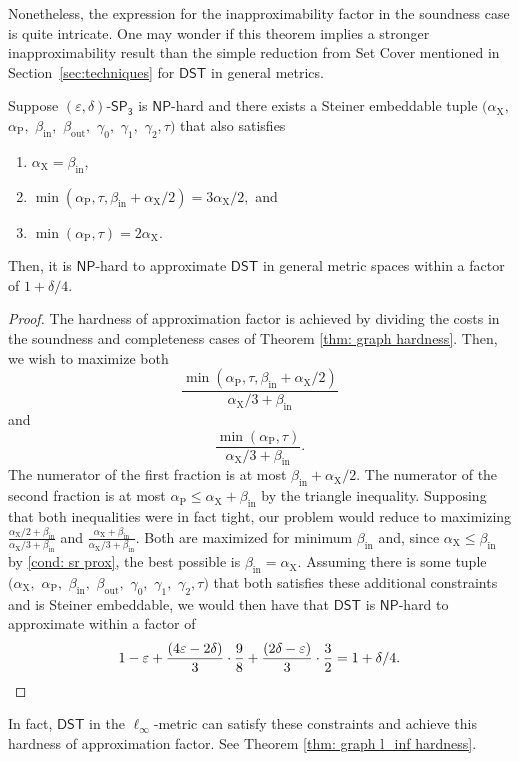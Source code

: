 \documentclass{theoretics}
\newcommand{\1}{\textbf{1}}
\newcommand{\setpT}{$\mathsf{SP_3}$\xspace}
\newcommand{\dst}{$\mathsf{DST}$\xspace}
\newcommand{\np}{$\mathsf{NP}$\xspace}
\newcommand{\td}{\tau}
\newcommand{\srd}{\alpha_{\text{X}}}
\newcommand{\trd}{\alpha_{\text{P}}}
\begin{document}
Nonetheless, the expression for the inapproximability factor in the soundness case is quite intricate. One may wonder if this theorem implies a stronger inapproximability result than the simple reduction from Set Cover mentioned in Section~\ref{sec:techniques} for \dst in general metrics.  
\begin{corollary} \label{cor: general metric useless?}
Suppose $(\varepsilon, \delta)$-\setpT is \np-hard and there exists a Steiner embeddable tuple $(\srd,$ $\trd,$ $\beta_{\text{in}},$ $\beta_{\text{out}},$ $\gamma_0,$ $\gamma_1,$ $\gamma_2,\td)$ that also satisfies 
\begin{enumerate}
    \item $\srd = \beta_{\text{in}}$,
    \item $\min(\trd, \td, \beta_{\text{in}} + \srd/2) = 3\srd/2,$ and
    \item $\min(\trd, \td) =2\srd$.
\end{enumerate}
Then, it is \np-hard to approximate \dst in general metric spaces within a factor of $1 + \delta/4$.
\end{corollary}
\begin{proof}
The hardness of approximation factor is achieved by dividing the costs in the soundness and completeness cases of Theorem \ref{thm: graph hardness}. Then, we wish to maximize both
\[
\frac{\min(\trd, \td, \beta_{\text{in}} + \srd/2)}{\srd/3+\beta_{\text{in}}} 
\]
and 
\[
\frac{\min(\trd, \td)}{\srd/3+\beta_{\text{in}}}.
\]
The numerator of the first fraction is at most $\beta_{\text{in}} + \srd/2$. The numerator of the second fraction is at most $\trd \leq \srd + \beta_{\text{in}}$ by the triangle inequality. Supposing that both inequalities were in fact tight, our problem would reduce to maximizing  $\frac{\srd/2 + \beta_{\text{in}} }{\srd/3+\beta_{\text{in}}}$ and $\frac{\srd + \beta_{\text{in}}}{\srd/3+\beta_{\text{in}}}$. Both are maximized for minimum $\beta_{\text{in}}$ and, since $\srd \leq \beta_{\text{in}}$ by \ref{cond: sr prox}, the best possible is $\beta_{\text{in}} = \srd$. Assuming there is some tuple $(\srd,$ $\trd,$ $\beta_{\text{in}},$ $\beta_{\text{out}},$ $\gamma_0,$ $\gamma_1,$ $\gamma_2,\td)$ that both satisfies these additional constraints and is Steiner embeddable, we would then have that \dst is \np-hard to approximate within a factor of 
\[
1 - \varepsilon + \frac{(4\varepsilon  - 2\delta)}{3}\cdot\frac{9}{8} + \frac{(2\delta  - \varepsilon)}{3} \cdot \frac{3}{2} = 1 + \delta/4.\qedhere
\]
\end{proof}
In fact, \dst in the $\ell_{\infty}$-metric can satisfy these constraints and achieve this hardness of approximation factor. See Theorem \ref{thm: graph l_inf hardness}.
\end{document}
